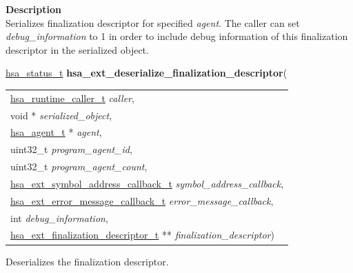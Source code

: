 \documentclass[final]{book}
\newcommand{\hsaarg}[1]{\textit{#1}}
\begin{document}
\vspace{-4mm}\noindent\textbf{Description}\\[1mm]
Serializes finalization descriptor for specified \textit{agent}. The caller can set \textit{debug_information} to 1 in order to include debug information of this finalization descriptor in the serialized object. 


\noindent\begin{tcolorbox}[breakable,nobeforeafter,colframe=white,colback=lightgray,left=0mm]
\hyperlink{group__status_1gad755322e7ff95456520e8abdbe90d225}{hsa_status_t} \hypertarget{group__FinalizerCoreApi_1ga27c0008c024431c7f391a8be453f9198}{\textbf{hsa_ext_deserialize_finalization_descriptor}}(
\vspace{-3.5mm}\begin{longtable}{@{}p{\textwidth}}
\hspace{1.7em}\hyperlink{group__RuntimeCommon_1ga7d9b1191602415f5dd3893985cc93826}{hsa_runtime_caller_t} \hsaarg{caller},\\
\hspace{1.7em}void * \hsaarg{serialized_object},\\
\hspace{1.7em}\hyperlink{group__topology_1gab8db3fb886332a24acac08ec361e1d86}{hsa_agent_t} * \hsaarg{agent},\\
\hspace{1.7em}uint32_t \hsaarg{program_agent_id},\\
\hspace{1.7em}uint32_t \hsaarg{program_agent_count},\\
\hspace{1.7em}\hyperlink{group__FinalizerCoreApi_1gaa0ae3a2a5a88c4b4799d4838da6c571e}{hsa_ext_symbol_address_callback_t} \hsaarg{symbol_address_callback},\\
\hspace{1.7em}\hyperlink{group__FinalizerCoreApi_1gace3d3971c5289675c4f88ce0045db41f}{hsa_ext_error_message_callback_t} \hsaarg{error_message_callback},\\
\hspace{1.7em}int \hsaarg{debug_information},\\
\hspace{1.7em}\hyperlink{group__FinalizerCoreApi_1ga891145420d6ee58bf56b59c557101b88}{hsa_ext_finalization_descriptor_t} ** \hsaarg{finalization_descriptor})\end{longtable}

\end{tcolorbox}
Deserializes the finalization descriptor.
\end{document}
